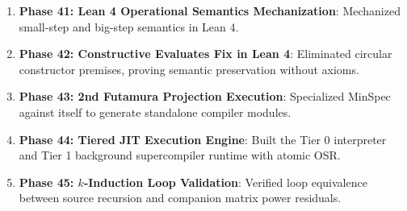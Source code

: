 \begin{enumerate}
    \item \textbf{Phase 41: Lean 4 Operational Semantics Mechanization}: Mechanized small-step and big-step semantics in Lean 4.
    \item \textbf{Phase 42: Constructive Evaluates Fix in Lean 4}: Eliminated circular constructor premises, proving semantic preservation without axioms.
    \item \textbf{Phase 43: 2nd Futamura Projection Execution}: Specialized MinSpec against itself to generate standalone compiler modules.
    \item \textbf{Phase 44: Tiered JIT Execution Engine}: Built the Tier 0 interpreter and Tier 1 background supercompiler runtime with atomic OSR.
    \item \textbf{Phase 45: $k$-Induction Loop Validation}: Verified loop equivalence between source recursion and companion matrix power residuals.
\end{enumerate}

